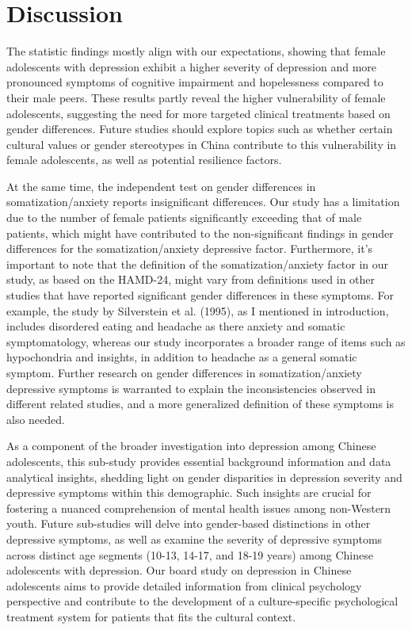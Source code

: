 \documentclass[
  man,floatsintext]{apa6}
\begin{document}
\hypertarget{discussion}{%
\section{Discussion}\label{discussion}}

The statistic findings mostly align with our expectations, showing that female adolescents with depression exhibit a higher severity of depression and more pronounced symptoms of cognitive impairment and hopelessness compared to their male peers. These results partly reveal the higher vulnerability of female adolescents, suggesting the need for more targeted clinical treatments based on gender differences. Future studies should explore topics such as whether certain cultural values or gender stereotypes in China contribute to this vulnerability in female adolescents, as well as potential resilience factors.

At the same time, the independent test on gender differences in somatization/anxiety reports insignificant differences. Our study has a limitation due to the number of female patients significantly exceeding that of male patients, which might have contributed to the non-significant findings in gender differences for the somatization/anxiety depressive factor. Furthermore, it's important to note that the definition of the somatization/anxiety factor in our study, as based on the HAMD-24, might vary from definitions used in other studies that have reported significant gender differences in these symptoms. For example, the study by Silverstein et al. (1995), as I mentioned in introduction, includes disordered eating and headache as there anxiety and somatic symptomatology, whereas our study incorporates a broader range of items such as hypochondria and insights, in addition to headache as a general somatic symptom. Further research on gender differences in somatization/anxiety depressive symptoms is warranted to explain the inconsistencies observed in different related studies, and a more generalized definition of these symptoms is also needed.

As a component of the broader investigation into depression among Chinese adolescents, this sub-study provides essential background information and data analytical insights, shedding light on gender disparities in depression severity and depressive symptoms within this demographic. Such insights are crucial for fostering a nuanced comprehension of mental health issues among non-Western youth. Future sub-studies will delve into gender-based distinctions in other depressive symptoms, as well as examine the severity of depressive symptoms across distinct age segments (10-13, 14-17, and 18-19 years) among Chinese adolescents with depression. Our board study on depression in Chinese adolescents aims to provide detailed information from clinical psychology perspective and contribute to the development of a culture-specific psychological treatment system for patients that fits the cultural context.
\end{document}

